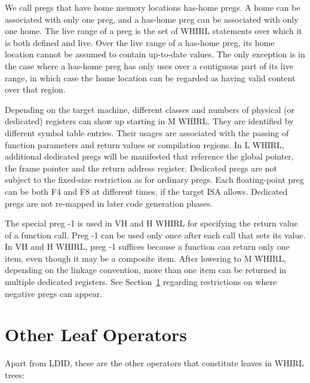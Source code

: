 \documentclass{article}
\begin{document}
\begin{itemize}
We call pregs
that have home memory locations has-home pregs. A home can be
associated with only one preg, and a has-home preg can be associated
with only one home. The live range of a preg is the set of
WHIRL statements over which it is both defined and live. Over the
live range of a has-home preg, its home location cannot be assumed
to contain up-to-date values. The only exception is in the case
where a has-home preg has only uses over a contiguous part of its live
range, in which case the home location can be regarded as having valid
content over that region. 

Depending on the target machine, different classes and numbers of
physical (or dedicated) registers can show up starting in M WHIRL.
They are identified by different symbol table entries. Their usages
are associated with the passing of function parameters and return
values or compilation regions. In L WHIRL, additional dedicated
pregs will be manifested that reference the global pointer, the
frame pointer and the return address register. Dedicated pregs are
not subject to the fixed-size restriction as for ordinary pregs.
Each floating-point preg can be both F4 and F8 at different times,
if the target ISA allows. Dedicated pregs are not re-mapped in
later code generation phases.

The special preg -1 is used in VH and H WHIRL for specifying the
return value of a function call. Preg -1 can be used only once after
each call that sets its value. In VH and H WHIRL, preg -1 suffices
because a function can return only one item, even though it may be
a composite item. After lowering to M WHIRL, depending on the
linkage convention, more than one item can be returned in multiple
dedicated registers. See Section~\ref{} regarding restrictions on
where negative pregs can appear.

\end{itemize}

\section{Other Leaf Operators}

Apart from LDID, these are the other operators that constitute
leaves in WHIRL trees:
\end{document}

